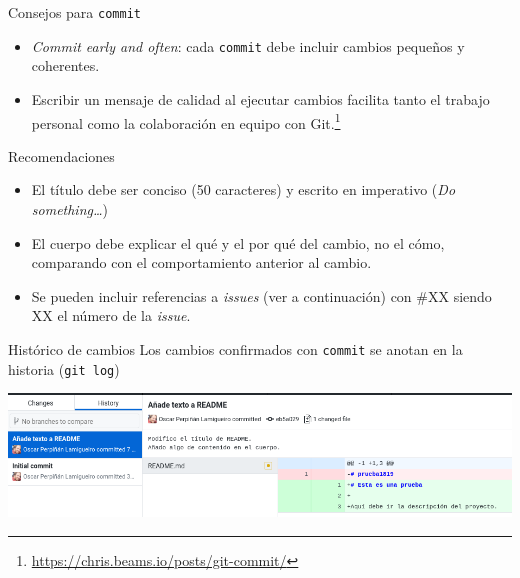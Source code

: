 \documentclass[xcolor={usenames,svgnames,dvipsnames}]{beamer}
\begin{document}
\begin{frame}[label={sec:org4b9fbaf},fragile]{Consejos para \texttt{commit}}
 \begin{itemize}
\item \emph{Commit early and often}: cada \texttt{commit} debe incluir cambios pequeños y coherentes.

\item Escribir un mensaje de calidad al ejecutar cambios facilita tanto el trabajo personal como la colaboración en equipo con Git.\footnote{\url{https://chris.beams.io/posts/git-commit/}}
\end{itemize}
\begin{block}{Recomendaciones}
\begin{itemize}
\item El \alert{título} debe ser \alert{conciso} (50 caracteres) y escrito en imperativo (\emph{Do something\ldots{}})
\item El \alert{cuerpo} debe explicar \alert{el qué y el por qué del cambio}, no el cómo, comparando con el comportamiento anterior al cambio.
\item Se pueden incluir referencias a \emph{issues} (ver a continuación) con \#XX siendo XX el número de la \emph{issue}.
\end{itemize}
\end{block}
\end{frame}
\begin{frame}[label={sec:org2c24e11},fragile]{Histórico de cambios}
 Los cambios confirmados con \texttt{commit} se anotan en la historia (\texttt{git log})

\begin{center}
\end{center}

\begin{center}
\includegraphics[width=.9\linewidth]{figs/git_history.png}
\end{center}
\end{frame}
\end{document}
